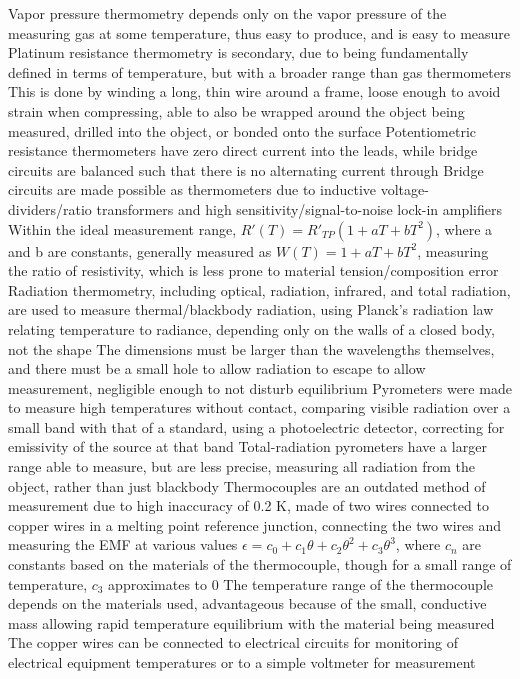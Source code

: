 \begin{outline*}
\1 Vapor pressure thermometry depends only on the vapor pressure of the measuring gas at some temperature, thus easy to produce, and is easy to measure
\1 Platinum resistance thermometry is secondary, due to being fundamentally defined in terms of temperature, but with a broader range than gas thermometers
\2 This is done by winding a long, thin wire around a frame, loose enough to avoid strain when compressing, able to also be wrapped around the object being measured, drilled into the object, or bonded onto the surface
\2 Potentiometric resistance thermometers have zero direct current into the leads, while bridge circuits are balanced such that there is no alternating current through
\3 Bridge circuits are made possible as thermometers due to inductive voltage-dividers/ratio transformers and high sensitivity/signal-to-noise lock-in amplifiers
\2 Within the ideal measurement range, $R'(T) = R'_{TP}(1 + aT + bT^2)$, where a and b are constants, generally measured as $W(T) = 1 + aT + bT^2$, measuring the ratio of resistivity, which is less prone to material tension/composition error
\1 Radiation thermometry, including optical, radiation, infrared, and total radiation, are used to measure thermal/blackbody radiation, using Planck's radiation law relating temperature to radiance, depending only on the walls of a closed body, not the shape
\2 The dimensions must be larger than the wavelengths themselves, and there must be a small hole to allow radiation to escape to allow measurement, negligible enough to not disturb equilibrium
\2 Pyrometers were made to measure high temperatures without contact, comparing visible radiation over a small band with that of a standard, using a photoelectric detector, correcting for emissivity of the source at that band
\2 Total-radiation pyrometers have a larger range able to measure, but are less precise, measuring all radiation from the object, rather than just blackbody
\1 Thermocouples are an outdated method of measurement due to high inaccuracy of 0.2 K, made of two wires connected to copper wires in a melting point reference junction, connecting the two wires and measuring the EMF at various values
\2 $\epsilon = c_0 + c_1\theta + c_2\theta^2 + c_3\theta^3$, where $c_n$ are constants based on the materials of the thermocouple, though for a small range of temperature, $c_3$ approximates to 0
\2 The temperature range of the thermocouple depends on the materials used, advantageous because of the small, conductive mass allowing rapid temperature equilibrium with the material being measured
\2 The copper wires can be connected to electrical circuits for monitoring of electrical equipment temperatures or to a simple voltmeter for measurement
\end{outline*}
